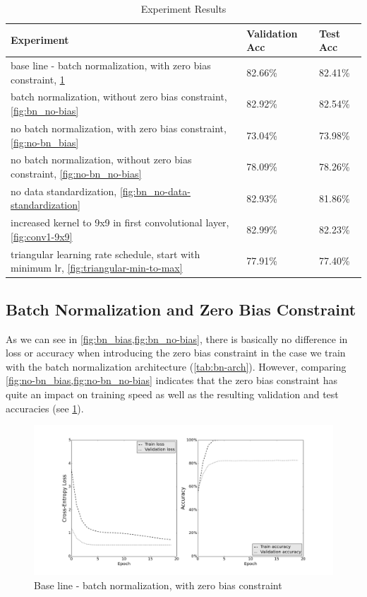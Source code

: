 \documentclass[a4paper, 11pt]{article}
\begin{document}
\begin{table}[!h]
	\begin{center}
		\begin{tabularx}{\linewidth}{|X|l|l|}
			\hline \textbf{Experiment} & \textbf{Validation Acc} & \textbf{Test Acc}\\ 
			\hline base line - batch normalization, with zero bias constraint, \cref{fig:bn_bias} & 82.66\% & 82.41\% \\
			\hline batch normalization, without zero bias constraint, \cref{fig:bn_no-bias} & 82.92\% & 82.54\% \\
			\hline no batch normalization, with zero bias constraint, \cref{fig:no-bn_bias} & 73.04\% & 73.98\% \\
			\hline no batch normalization, without zero bias constraint, \cref{fig:no-bn_no-bias} & 78.09\% & 78.26\% \\
			\hline no data standardization, \cref{fig:bn_no-data-standardization} & 82.93\% & 81.86\% \\
			\hline increased kernel to 9x9 in first convolutional layer, \cref{fig:conv1-9x9} & 82.99\% & 82.23\% \\
			\hline triangular learning rate schedule, start with minimum lr, \cref{fig:triangular-min-to-max} & 77.91\% & 77.40\% \\
			\hline
		\end{tabularx}
	\end{center}
	\caption{Experiment Results}
	\label{tab:experiment-results}
\end{table}

\clearpage
\subsection{Batch Normalization and Zero Bias Constraint} \label{sec:batch}

As we can see in \cref{fig:bn_bias,fig:bn_no-bias}, there is basically no difference in loss or accuracy when introducing the zero bias constraint in the case we train with the batch normalization architecture (\cref{tab:bn-arch}).
However, comparing \cref{fig:no-bn_bias,fig:no-bn_no-bias} indicates that the zero bias constraint has quite an impact on training speed as well as the resulting validation and test accuracies (see \cref{tab:experiment-results}).


\begin{figure}[H]
	\includegraphics[width=\linewidth]{bn_bias-constraint.png}
	\caption{Base line - batch normalization, with zero bias constraint}
	\label{fig:bn_bias}
\end{figure}
\end{document}
